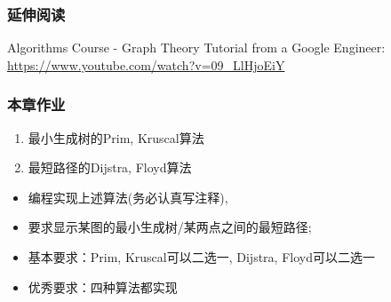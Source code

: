 \begin{frame}[fragile]
	\frametitle{延伸阅读}
    
    Algorithms Course - Graph Theory Tutorial from a Google Engineer: 
    \url{https://www.youtube.com/watch?v=09_LlHjoEiY}


\end{frame}

\begin{frame}[fragile]
  \frametitle{本章作业}
  \begin{enumerate}
  \item 最小生成树的Prim, Kruscal算法
  \item 最短路径的Dijstra, Floyd算法
  \end{enumerate}

  \begin{itemize}
  \item 编程实现上述算法(务必认真写注释),
  \item 要求显示某图的最小生成树/某两点之间的最短路径;
  \item 基本要求：Prim, Kruscal可以二选一, Dijstra, Floyd可以二选一
  \item 优秀要求：四种算法都实现
  \end{itemize}
\end{frame}